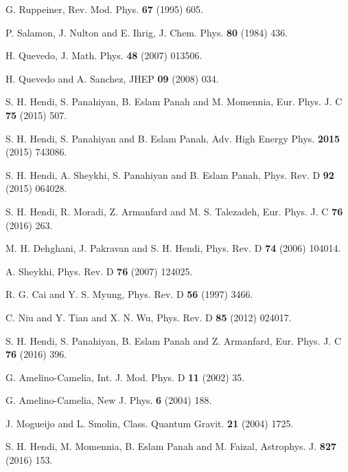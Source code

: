 \documentclass[aps,onecolumn ]{revtex4}
\begin{document}
\begin{thebibliography}{99}
 G. Ruppeiner, Rev. Mod. Phys. \textbf{67} (1995) 605.

 P. Salamon, J. Nulton and E. Ihrig, J. Chem. Phys. \textbf{80} (1984) 436.

 H. Quevedo, J. Math. Phys. \textbf{48} (2007)
013506.

 H. Quevedo and A. Sanchez, JHEP \textbf{09} (2008) 034.

 S. H. Hendi, S. Panahiyan, B. Eslam Panah and M.
Momennia, Eur. Phys. J. C \textbf{75} (2015) 507.

 S. H. Hendi, S. Panahiyan and B. Eslam Panah, Adv. High Energy
Phys. \textbf{2015} (2015) 743086.

 S. H. Hendi, A. Sheykhi, S. Panahiyan and B. Eslam Panah, Phys.
Rev. D \textbf{92} (2015) 064028.

 S. H. Hendi, R. Moradi, Z. Armanfard and M. S.
Talezadeh, Eur. Phys. J. C \textbf{76} (2016) 263.

 M. H. Dehghani, J. Pakravan and S. H. Hendi, Phys. Rev. D \textbf{74}
 (2006) 104014.

 A. Sheykhi, Phys. Rev. D \textbf{76} (2007) 124025.

 R. G. Cai and Y. S. Myung, Phys. Rev. D \textbf{56}
(1997) 3466.

 C. Niu and Y. Tian and X. N. Wu, Phys. Rev. D \textbf{85} (2012) 024017.

 S. H. Hendi, S. Panahiyan, B. Eslam Panah and Z.
Armanfard, Eur. Phys. J. C \textbf{76} (2016) 396.


 G. Amelino-Camelia, Int. J. Mod. Phys. D \textbf{11} (2002)
35.

 G. Amelino-Camelia, New J. Phys. \textbf{6} (2004) 188.

 J. Mogueijo and L. Smolin, Class. Quantum Gravit. \textbf{21} (2004)
1725.

 S. H. Hendi, M. Momennia, B. Eslam Panah and M. Faizal, Astrophys.
J. \textbf{827} (2016) 153.


\end{thebibliography}
\end{document}

